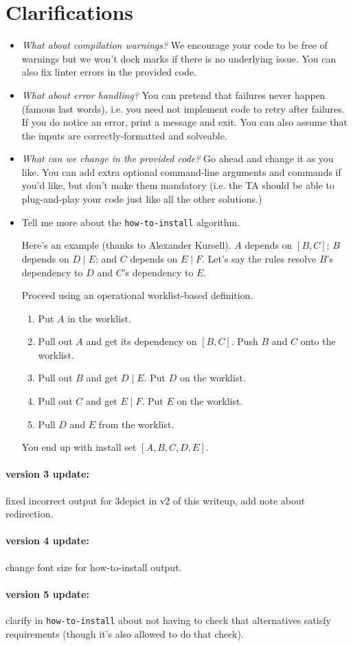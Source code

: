 \documentclass[12pt]{article}
\renewcommand{\_}{\kern-1.5pt\textunderscore\kern-1.5pt}
\begin{document}
\section*{Clarifications}
\begin{itemize}
\item \emph{What about compilation warnings?} We encourage your code to be free of warnings but we won't dock marks if there is no underlying issue. You can also fix linter errors in the provided code.
\item \emph{What about error handling?} You can pretend that failures never happen (famous last words), i.e. you need not implement code to retry after failures. If you do notice an error, print a message and exit. You can also assume that the inputs are correctly-formatted and solveable.
  \item \emph{What can we change in the provided code?} Go ahead and change it as you like. You can add extra optional command-line arguments and commands if you'd like, but don't make them mandatory (i.e. the TA should be able to plug-and-play your code just like all the other solutions.) 
\item Tell me more about the \texttt{how-to-install} algorithm.

\vspace{1em} Here's an example (thanks to Alexander Kursell). $A$ depends on $[B, C]$; $B$ depends on $D \mid E$; and $C$ depends on $E \mid F$. Let's say the rules resolve $B$'s dependency to $D$ and $C$'s dependency to $E$.

\vspace{1em} Proceed using an operational worklist-based definition. 
\begin{enumerate}[noitemsep]
\item Put $A$ in the worklist.
\item Pull out $A$ and get its dependency on $[B, C]$. Push $B$ and $C$ onto the worklist.
\item Pull out $B$ and get $D \mid E$. Put $D$ on the worklist.
\item Pull out $C$ and get $E \mid F$. Put $E$ on the worklist.
\item Pull $D$ and $E$ from the worklist.
\end{enumerate}
You end up with install set $[A, B, C, D, E]$.
\end{itemize}

\paragraph{version 3 update:} fixed incorrect output for 3depict in v2 of this writeup, add note about redirection.

\paragraph{version 4 update:} change font size for how-to-install output.

\paragraph{version 5 update:} clarify in \texttt{how-to-install} about not having to check that alternatives satisfy requirements (though it's also allowed to do that check).
\end{document}
